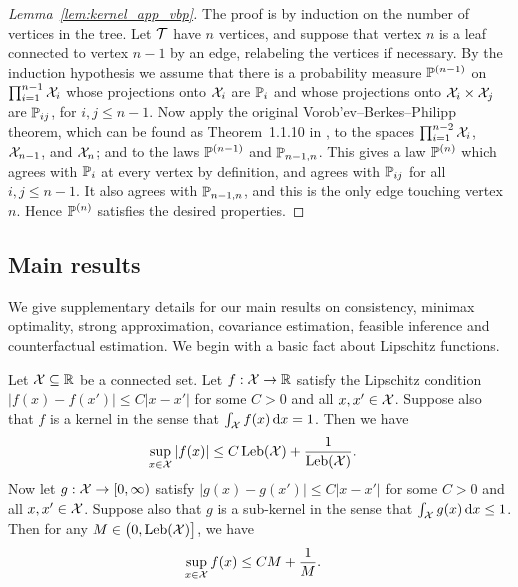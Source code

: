 \begin{proof}[Lemma~\ref{lem:kernel_app_vbp}]

  The proof is by induction on the number of vertices in the tree.
  Let $\cT$ have $n$ vertices,
  and suppose that vertex $n$ is a leaf
  connected to vertex $n-1$ by an edge,
  relabeling the vertices if necessary.
  By the induction hypothesis we assume that there is a
  probability measure $\P^{(n-1)}$
  on $\prod_{i=1}^{n-1} \cX_i$
  whose projections onto $\cX_i$ are $\P_i$
  and whose projections onto $\cX_i \times \cX_j$ are $\P_{i j}$,
  for $i,j \leq n-1$.
  Now apply the original
  Vorob'ev--Berkes--Philipp theorem,
  which can be found as Theorem~1.1.10 in
  \citet{dudley1999uniform},
  to the spaces
  $\prod_{i=1}^{n-2} \cX_i$,\,
  $\cX_{n-1}$, and
  $\cX_n$;
  and to the laws
  $\P^{(n-1)}$
  and
  $\P_{n-1, n}$.
  This gives a law $\P^{(n)}$
  which agrees with $\P_i$
  at every vertex by definition,
  and agrees with
  $\P_{i j}$ for all $i,j \leq n-1$.
  It also agrees with $\P_{n-1,n}$,
  and this is the only edge touching vertex $n$.
  Hence $\P^{(n)}$ satisfies the desired properties.
\end{proof}

\subsection{Main results}
\label{sec:kernel_app_main}

We give supplementary details for our main results on consistency, minimax
optimality, strong approximation, covariance estimation, feasible inference and
counterfactual estimation.
We begin with a basic fact about Lipschitz functions.

\begin{lemma}
  \label{lem:kernel_app_lipschitz_kernels_bounded}

  Let $\cX \subseteq \R$ be a connected set.
  Let $f: \cX \to \R$ satisfy the Lipschitz condition
  $|f(x) - f(x')| \leq C |x-x'|$ for some $C > 0$
  and all $x, x' \in \cX$.
  Suppose also that $f$ is a kernel in the sense that
  $\int_\cX f(x) \diff{x} = 1$.
  Then we have
  \begin{align*}
    \sup_{x \in \cX} |f(x)|
    &\leq
    C \Leb(\cX) + \frac{1}{\Leb(\cX)}.
  \end{align*}
  Now let $g: \cX \to [0,\infty)$ satisfy
  $|g(x) - g(x')| \leq C |x-x'|$ for some $C > 0$
  and all $x, x' \in \cX$.
  Suppose also that $g$ is a sub-kernel in the sense that
  $\int_\cX g(x) \diff{x} \leq 1$.
  Then for any $M \in \big(0, \Leb(\cX)\big]$,
  we have
  \begin{align*}
    \sup_{x \in \cX} f(x)
    &\leq
    C M + \frac{1}{M}.
  \end{align*}

\end{lemma}

